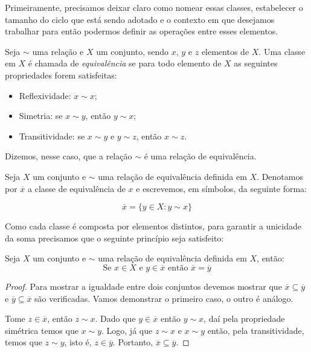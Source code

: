 Primeiramente, precisamos deixar claro como nomear essas classes, estabelecer o tamanho do ciclo que est\'a sendo adotado 
e o contexto em que desejamos trabalhar para ent\~{a}o podermos definir as opera\c{c}\~{o}es entre esses elementos.
 

\begin{Df}
	Seja $\sim$ uma rela\c{c}\~{a}o e $X$ um conjunto, sendo $x$, $y$ e $z$ elementos de $X$. 
	Uma classe em $X$ \'{e} chamada de \textsl{equival\^{e}ncia} se 
	para todo elemento de $X$ as seguintes propriedades forem satisfeitas:
	\begin{itemize}
		\item Reflexividade: $x\sim x$; 		
		\item Simetria: se $x\sim y$, ent\~{a}o $y\sim x$; 
		\item Transitividade: se $x\sim y$ e $y\sim z$, ent\~{a}o $x\sim z$.
	\end{itemize}
\end{Df}   
	
	
	Dizemos, nesse caso, que a rela\c{c}\~ao $\sim$ \'e uma rela\c{c}\~{a}o de equival\^encia. 
		
	Seja $X$ um conjunto e $\sim$ uma rela\c{c}\~{a}o de equival\^{e}ncia definida em $X$. Denotamos por $\overline{x}$ 
	a classe de equival\^{e}ncia de $x$ e escrevemos, em s\'{i}mbolos, da seguinte forma:
	
	                     $$\overline{x}=\{y\in X: y\sim x\}$$
	
	Como cada classe \'{e} composta por elementos distintos, para garantir a unicidade da soma precisamos que o 
	seguinte princ\'{i}pio seja satisfeito:
	
	\begin{Th}
		Seja $X$ um conjunto e $\sim$ uma rela\c{c}\~{a}o de equival\^{e}ncia definida em $X$, ent\~{a}o:
		$$\textrm{Se } x\in X \textrm{ e } y\in\overline{x} \textrm{ ent\~{a}o } \overline{x}=\overline{y}$$
	\end{Th}
	
	\begin{proof}
		Para mostrar a igualdade entre dois conjuntos devemos mostrar que $\overline{x}\subseteq\overline{y}$
		e $\overline{y}\subseteq\overline{x}$ s\~ao verificadas. Vamos demonstrar o primeiro caso, o outro \'{e} an\'{a}logo.
			
		Tome $z\in\overline{x}$, ent\~{a}o $z\sim x$. Dado que $y\in\overline{x}$
			ent\~{a}o $y\sim x$, da\'{i} pela propriedade sim\'{e}trica temos que $x\sim y$. Logo, j\'{a} que 
			$z\sim x$ e $x\sim y$ ent\~{a}o, pela transitividade, temos que $z\sim y$, isto \'{e}, $z\in\overline{y}$.
			Portanto, $\overline{x}\subseteq\overline{y}$. 
	\end{proof}
	
